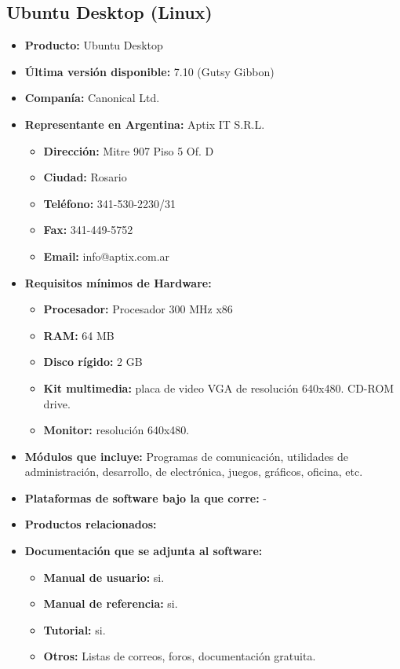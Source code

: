 \subsection{Ubuntu Desktop (Linux)}

\begin{itemize}
  \item \textbf{Producto:} Ubuntu Desktop
  \item \textbf{Última versión disponible:} 7.10 (Gutsy Gibbon)
  \item \textbf{Companía:} Canonical Ltd.

  \item \textbf{Representante en Argentina:} Aptix IT S.R.L.
    \begin{itemize}
      \item \textbf{Dirección:} Mitre 907 Piso 5 Of. D
      \item \textbf{Ciudad:} Rosario
      \item \textbf{Teléfono:} 341-530-2230/31
      \item \textbf{Fax:} 341-449-5752
      \item \textbf{Email:} info@aptix.com.ar
    \end{itemize}

  \item \textbf{Requisitos mínimos de Hardware:}
    \begin{itemize}
      \item \textbf{Procesador:} Procesador 300 MHz x86
      \item \textbf{RAM:} 64 MB
      \item \textbf{Disco rígido:} 2 GB
      \item \textbf{Kit multimedia:} placa de video VGA de resolución 640x480. CD-ROM drive.
      \item \textbf{Monitor:} resolución 640x480.
    \end{itemize}

  \item \textbf{Módulos que incluye:} Programas de comunicación, utilidades de administración, desarrollo, de electrónica, juegos, gráficos, oficina, etc.
  \item \textbf{Plataformas de software bajo la que corre:} -
  \item \textbf{Productos relacionados:} 

  \item \textbf{Documentación que se adjunta al software:}
    \begin{itemize}
      \item \textbf{Manual de usuario:} si.
      \item \textbf{Manual de referencia:} si.
      \item \textbf{Tutorial:} si.
      \item \textbf{Otros:} Listas de correos, foros, documentación gratuita.
    \end{itemize}


\end{itemize}
